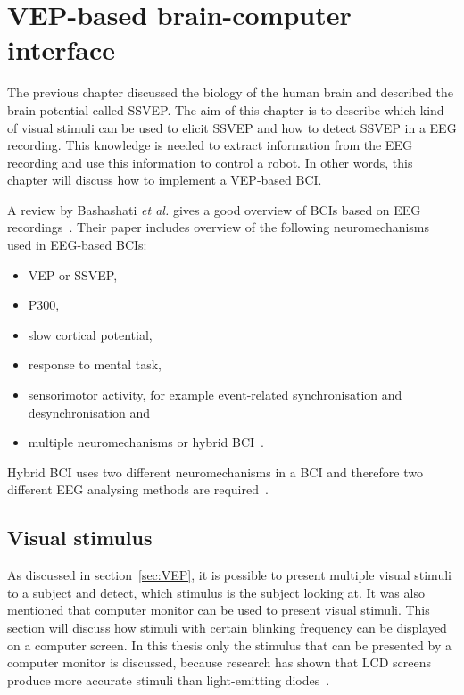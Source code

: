 
\chapter{VEP-based brain-computer interface}

The previous chapter discussed the biology of the human brain and described the brain potential called \gls{SSVEP}. The aim of this chapter is to describe which kind of visual stimuli can be used to elicit \gls{SSVEP} and how to detect \gls{SSVEP} in a \gls{EEG} recording. This knowledge is needed to extract information from the \gls{EEG} recording and use this information to control a robot. In other words, this chapter will discuss how to implement a \gls{VEP}-based \gls{BCI}.

A review by Bashashati \emph{et al.} gives a good overview of \glspl{BCI} based on \gls{EEG} recordings~\cite{bci_comparison}. Their paper includes overview of the following neuromechanisms used in \gls{EEG}-based \glspl{BCI}:
\begin{itemize}
	\item \gls{VEP} or \gls{SSVEP},
	\item P300,
	\item slow cortical potential,
	\item response to mental task,
	\item sensorimotor activity, for example event-related synchronisation and desynchronisation and
	\item multiple neuromechanisms or hybrid \gls{BCI}~\cite{hybrid_bci, hybrid_bci2}.
\end{itemize}
Hybrid \gls{BCI} uses two different neuromechanisms in a \gls{BCI} and therefore two different \gls{EEG} analysing methods are required~\cite{hybrid_bci, hybrid_bci2}.

\section{Visual stimulus}
\label{sec:stimuli}

As discussed in section~\ref{sec:VEP}, it is possible to present multiple visual stimuli to a subject and detect, which stimulus is the subject looking at. It was also mentioned that computer monitor can be used to present visual stimuli. This section will discuss how stimuli with certain blinking frequency can be displayed on a computer screen. In this thesis only the stimulus that can be presented by a computer monitor is discussed, because research has shown that LCD screens produce more accurate stimuli than light-emitting diodes~\cite{lcd_lcd_led}. 

